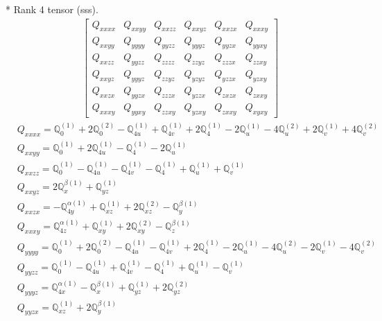 \documentclass[fleqn,8pt,landscape]{jsarticle}
\begin{document}
* Rank 4 tensor (sss).
\begin{align*}
\begin{bmatrix} Q_{xxxx} & Q_{xxyy} & Q_{xxzz} & Q_{xxyz} & Q_{xxzx} & Q_{xxxy} \\ Q_{xxyy} & Q_{yyyy} & Q_{yyzz} & Q_{yyyz} & Q_{yyzx} & Q_{yyxy} \\ Q_{xxzz} & Q_{yyzz} & Q_{zzzz} & Q_{zzyz} & Q_{zzzx} & Q_{zzxy} \\ Q_{xxyz} & Q_{yyyz} & Q_{zzyz} & Q_{yzyz} & Q_{yzzx} & Q_{yzxy} \\ Q_{xxzx} & Q_{yyzx} & Q_{zzzx} & Q_{yzzx} & Q_{zxzx} & Q_{zxxy} \\ Q_{xxxy} & Q_{yyxy} & Q_{zzxy} & Q_{yzxy} & Q_{zxxy} & Q_{xyxy} \end{bmatrix}
\end{align*}
\begin{align*}
& Q_{xxxx} = \mathbb{Q}_{0}^{(1)} + 2 \mathbb{Q}_{0}^{(2)} - \mathbb{Q}_{4u}^{(1)} + \mathbb{Q}_{4v}^{(1)} + 2 \mathbb{Q}_{4}^{(1)} - 2 \mathbb{Q}_{u}^{(1)} - 4 \mathbb{Q}_{u}^{(2)} + 2 \mathbb{Q}_{v}^{(1)} + 4 \mathbb{Q}_{v}^{(2)} \\
& Q_{xxyy} = \mathbb{Q}_{0}^{(1)} + 2 \mathbb{Q}_{4u}^{(1)} - \mathbb{Q}_{4}^{(1)} - 2 \mathbb{Q}_{u}^{(1)} \\
& Q_{xxzz} = \mathbb{Q}_{0}^{(1)} - \mathbb{Q}_{4u}^{(1)} - \mathbb{Q}_{4v}^{(1)} - \mathbb{Q}_{4}^{(1)} + \mathbb{Q}_{u}^{(1)} + \mathbb{Q}_{v}^{(1)} \\
& Q_{xxyz} = 2 \mathbb{Q}_{x}^{\beta(1)} + \mathbb{Q}_{yz}^{(1)} \\
& Q_{xxzx} = - \mathbb{Q}_{4y}^{\alpha(1)} + \mathbb{Q}_{xz}^{(1)} + 2 \mathbb{Q}_{xz}^{(2)} - \mathbb{Q}_{y}^{\beta(1)} \\
& Q_{xxxy} = \mathbb{Q}_{4z}^{\alpha(1)} + \mathbb{Q}_{xy}^{(1)} + 2 \mathbb{Q}_{xy}^{(2)} - \mathbb{Q}_{z}^{\beta(1)} \\
& Q_{yyyy} = \mathbb{Q}_{0}^{(1)} + 2 \mathbb{Q}_{0}^{(2)} - \mathbb{Q}_{4u}^{(1)} - \mathbb{Q}_{4v}^{(1)} + 2 \mathbb{Q}_{4}^{(1)} - 2 \mathbb{Q}_{u}^{(1)} - 4 \mathbb{Q}_{u}^{(2)} - 2 \mathbb{Q}_{v}^{(1)} - 4 \mathbb{Q}_{v}^{(2)} \\
& Q_{yyzz} = \mathbb{Q}_{0}^{(1)} - \mathbb{Q}_{4u}^{(1)} + \mathbb{Q}_{4v}^{(1)} - \mathbb{Q}_{4}^{(1)} + \mathbb{Q}_{u}^{(1)} - \mathbb{Q}_{v}^{(1)} \\
& Q_{yyyz} = \mathbb{Q}_{4x}^{\alpha(1)} - \mathbb{Q}_{x}^{\beta(1)} + \mathbb{Q}_{yz}^{(1)} + 2 \mathbb{Q}_{yz}^{(2)} \\
& Q_{yyzx} = \mathbb{Q}_{xz}^{(1)} + 2 \mathbb{Q}_{y}^{\beta(1)} \\

\end{align*}
\end{document}
